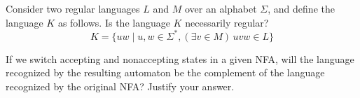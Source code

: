 \documentclass[a4paper,12pt]{amsart}
\begin{document}
\medskip\begin{problem}[Cut] 
    Consider two regular languages $L$ and $M$ over an alphabet $\Sigma$, and define the language $K$ as follows. Is the language $K$ necessarily regular? 
    $$  
    K=\{uw\mid u,w\in\Sigma^*, (\exists v\in M)\, uvw\in L\}  
    $$
\end{problem}  


\medskip\begin{problem}
    
    If we switch accepting and nonaccepting states in a given NFA, will the language recognized by the resulting automaton be the complement of the language recognized by the original NFA? Justify your answer.

\end{problem}
   
\end{document}

